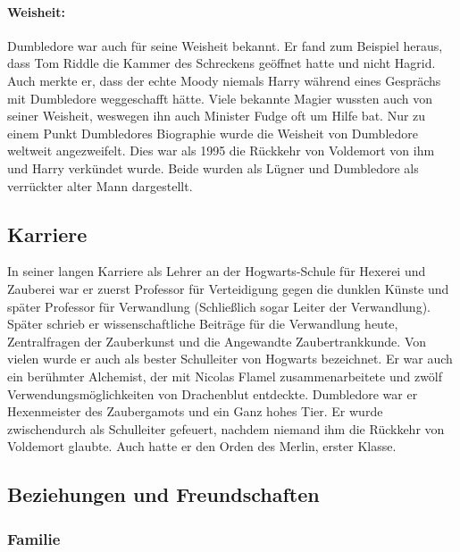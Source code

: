 \documentclass[a4paper, 10pt]{article}
\begin{document}
\paragraph{Weisheit:}
Dumbledore war auch für seine Weisheit bekannt. Er fand zum Beispiel heraus, dass Tom Riddle die Kammer des Schreckens geöffnet hatte und nicht Hagrid. Auch merkte er, dass der echte Moody niemals Harry während eines Gesprächs mit Dumbledore weggeschafft hätte. Viele bekannte Magier wussten auch von seiner Weisheit, weswegen ihn auch Minister Fudge oft um Hilfe bat. Nur zu einem Punkt Dumbledores Biographie wurde die Weisheit von Dumbledore weltweit angezweifelt. Dies war als 1995 die Rückkehr von Voldemort von ihm und Harry verkündet wurde. Beide wurden als Lügner und Dumbledore als verrückter alter Mann dargestellt.


\subsection*{\Large Karriere}
In seiner langen Karriere als Lehrer an der Hogwarts-Schule für Hexerei und Zauberei war er zuerst Professor für Verteidigung gegen die dunklen Künste und später Professor für Verwandlung (Schließlich sogar Leiter der Verwandlung). Später schrieb er wissenschaftliche Beiträge für die Verwandlung heute, Zentralfragen der Zauberkunst und die Angewandte Zaubertrankkunde. Von vielen wurde er auch als bester Schulleiter von Hogwarts bezeichnet. Er war auch ein berühmter Alchemist, der mit Nicolas Flamel zusammenarbeitete und zwölf Verwendungsmöglichkeiten von Drachenblut entdeckte.
\vspace{10pt}
\newline
Dumbledore war er Hexenmeister des Zaubergamots und ein Ganz hohes Tier. Er wurde zwischendurch als Schulleiter gefeuert, nachdem niemand ihm die Rückkehr von Voldemort glaubte. Auch hatte er den Orden des Merlin, erster Klasse.

\subsection*{\Large Beziehungen und Freundschaften}
\subsubsection*{\large Familie}
\end{document}
